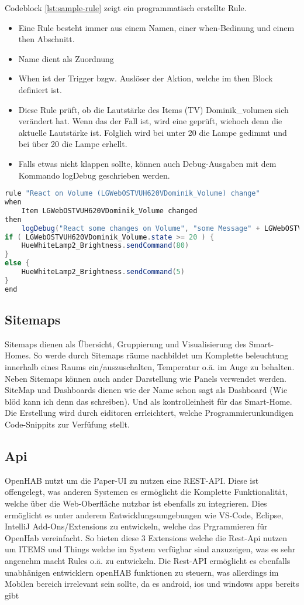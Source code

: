 Codeblock \ref{lst:sample-rule} zeigt ein programmatisch erstellte Rule.
\begin{itemize}
		\item Eine Rule besteht immer aus einem Namen, einer when-Bedinung und einem then Abschnitt.
		\item Name dient als Zuordnung
		\item When ist der Trigger bzgw. Auslöser der Aktion, welche im then Block definiert ist.
		\item Diese Rule prüft, ob die Lautstärke des Items (TV) Dominik\_volumen sich verändert hat.
		Wenn das der Fall ist, wird eine geprüft, wiehoch denn die aktuelle Lautstärke ist.
		Folglich wird bei unter 20 die Lampe gedimmt und bei über 20 die Lampe erhellt.
		\item Falls etwas nicht klappen sollte, können auch Debug-Ausgaben mit dem Kommando logDebug geschrieben werden.
\end{itemize}

\begin{lstlisting}[language=java,firstnumber=1,caption=Beispiele Rule Beispiel,label=lst:sample-rule]
rule "React on Volume (LGWebOSTVUH620VDominik_Volume) change"
when
	Item LGWebOSTVUH620VDominik_Volume changed
then
	logDebug("React some changes on Volume", "some Message" + LGWebOSTVUH620VDominik_Volume.state.toString)
if ( LGWebOSTVUH620VDominik_Volume.state >= 20 ) {
	HueWhiteLamp2_Brightness.sendCommand(80)
}
else {
	HueWhiteLamp2_Brightness.sendCommand(5)
}
end
\end{lstlisting}

\subsection{Sitemaps}
Sitemaps dienen als Übersicht, Gruppierung und Visualisierung des Smart-Homes. So werde durch Sitemaps räume nachbildet um Komplette beleuchtung innerhalb eines Raums ein/auszuschalten, Temperatur o.ä. im Auge zu behalten. Neben Sitemaps können auch ander Darstellung wie Panels verwendet werden. SiteMap und Dashboards dienen wie der Name schon sagt als Dashboard (Wie blöd kann ich denn das schreiben). Und als kontrolleinheit für das Smart-Home. Die Erstellung wird durch eiditoren errleichtert, welche Programmierunkundigen Code-Snippits zur Verfüfung stellt.

\subsection{Api}
OpenHAB nutzt um die Paper-UI zu nutzen eine REST-API. Diese ist offengelegt, was anderen Systemen es ermöglicht die Komplette Funktionalität, welche über die Web-Oberfläche nutzbar ist ebenfalls zu integrieren. Dies ermöglicht es unter anderem Entwicklungsumgebungen wie VS-Code, Eclipse, IntelliJ Add-Ons/Extensions zu entwickeln, welche das Prgrammieren für OpenHab vereinfacht. So bieten diese 3 Extensions welche die Rest-Api nutzen um ITEMS und Things welche im System verfügbar sind anzuzeigen, was es sehr angenehm macht Rules o.ä. zu entwickeln.
Die Rest-API ermöglicht es ebenfalls unabhänigen entwicklern openHAB funktionen zu steuern, was allerdings im Mobilen bereich irrelevant sein sollte, da es android, ios und windows apps bereits gibt


